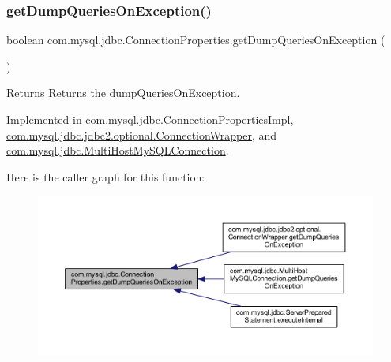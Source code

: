 \subsubsection{\texorpdfstring{get\+Dump\+Queries\+On\+Exception()}{getDumpQueriesOnException()}}
{\footnotesize\ttfamily boolean com.\+mysql.\+jdbc.\+Connection\+Properties.\+get\+Dump\+Queries\+On\+Exception (\begin{DoxyParamCaption}{ }\end{DoxyParamCaption})}

\begin{DoxyReturn}{Returns}
Returns the dump\+Queries\+On\+Exception. 
\end{DoxyReturn}


Implemented in \mbox{\hyperlink{classcom_1_1mysql_1_1jdbc_1_1_connection_properties_impl_a500213349eb1bb4982e51d96d261e8ae}{com.\+mysql.\+jdbc.\+Connection\+Properties\+Impl}}, \mbox{\hyperlink{classcom_1_1mysql_1_1jdbc_1_1jdbc2_1_1optional_1_1_connection_wrapper_a21a6730d44ced20d8242a8adaae34364}{com.\+mysql.\+jdbc.\+jdbc2.\+optional.\+Connection\+Wrapper}}, and \mbox{\hyperlink{classcom_1_1mysql_1_1jdbc_1_1_multi_host_my_s_q_l_connection_a88ceed8bf1e9e9b2b9d4e524eebb727f}{com.\+mysql.\+jdbc.\+Multi\+Host\+My\+S\+Q\+L\+Connection}}.

Here is the caller graph for this function\+:\nopagebreak
\begin{figure}[H]
\begin{center}
\leavevmode
\includegraphics[width=350pt]{interfacecom_1_1mysql_1_1jdbc_1_1_connection_properties_a582cd7a28b4d507bf0e3ceaae3680763_icgraph}
\end{center}
\end{figure}
\mbox{\label{interfacecom_1_1mysql_1_1jdbc_1_1_connection_properties_aa8a465589df5cfff61d5903b1cb6fb85}} 
